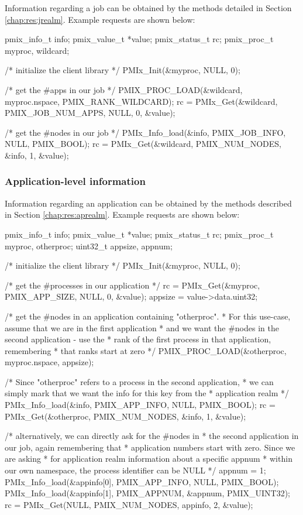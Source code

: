 Information regarding a job can be obtained by the methods detailed in Section \ref{chap:res:jrealm}. Example requests are shown below:

\cspecificstart
\begin{codepar}
pmix_info_t info;
pmix_value_t *value;
pmix_status_t rc;
pmix_proc_t myproc, wildcard;

/* initialize the client library */
PMIx_Init(&myproc, NULL, 0);

/* get the #apps in our job */
PMIX_PROC_LOAD(&wildcard, myproc.nspace, PMIX_RANK_WILDCARD);
rc = PMIx_Get(&wildcard, PMIX_JOB_NUM_APPS, NULL, 0, &value);

/* get the #nodes in our job */
PMIx_Info_load(&info, PMIX_JOB_INFO, NULL, PMIX_BOOL);
rc = PMIx_Get(&wildcard, PMIX_NUM_NODES, &info, 1, &value);
\end{codepar}
\cspecificend


\subsubsection{Application-level information}

Information regarding an application can be obtained by the methods described in Section \ref{chap:res:aprealm}. Example requests are shown below:

\cspecificstart
\begin{codepar}
pmix_info_t info;
pmix_value_t *value;
pmix_status_t rc;
pmix_proc_t myproc, otherproc;
uint32_t appsize, appnum;

/* initialize the client library */
PMIx_Init(&myproc, NULL, 0);

/* get the #processes in our application */
rc = PMIx_Get(&myproc, PMIX_APP_SIZE, NULL, 0, &value);
appsize = value->data.uint32;

/* get the #nodes in an application containing "otherproc".
 * For this use-case, assume that we are in the first application
 * and we want the #nodes in the second application - use the
 * rank of the first process in that application, remembering
 * that ranks start at zero */
PMIX_PROC_LOAD(&otherproc, myproc.nspace, appsize);

/* Since "otherproc" refers to a process in the second application,
 * we can simply mark that we want the info for this key from the
 * application realm */
PMIx_Info_load(&info, PMIX_APP_INFO, NULL, PMIX_BOOL);
rc = PMIx_Get(&otherproc, PMIX_NUM_NODES, &info, 1, &value);

/* alternatively, we can directly ask for the #nodes in
 * the second application in our job, again remembering that
 * application numbers start with zero. Since we are asking
 * for application realm information about a specific appnum
 * within our own namespace, the process identifier can be NULL */
appnum = 1;
PMIx_Info_load(&appinfo[0], PMIX_APP_INFO, NULL, PMIX_BOOL);
PMIx_Info_load(&appinfo[1], PMIX_APPNUM, &appnum, PMIX_UINT32);
rc = PMIx_Get(NULL, PMIX_NUM_NODES, appinfo, 2, &value);
\end{codepar}
\cspecificend


